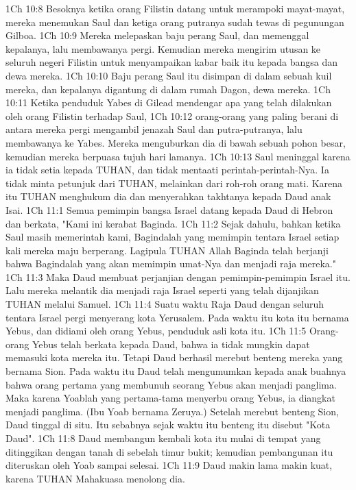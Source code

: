 1Ch 10:8  Besoknya ketika orang Filistin datang untuk merampoki mayat-mayat, mereka menemukan Saul dan ketiga orang putranya sudah tewas di pegunungan Gilboa.
1Ch 10:9  Mereka melepaskan baju perang Saul, dan memenggal kepalanya, lalu membawanya pergi. Kemudian mereka mengirim utusan ke seluruh negeri Filistin untuk menyampaikan kabar baik itu kepada bangsa dan dewa mereka.
1Ch 10:10  Baju perang Saul itu disimpan di dalam sebuah kuil mereka, dan kepalanya digantung di dalam rumah Dagon, dewa mereka.
1Ch 10:11  Ketika penduduk Yabes di Gilead mendengar apa yang telah dilakukan oleh orang Filistin terhadap Saul,
1Ch 10:12  orang-orang yang paling berani di antara mereka pergi mengambil jenazah Saul dan putra-putranya, lalu membawanya ke Yabes. Mereka menguburkan dia di bawah sebuah pohon besar, kemudian mereka berpuasa tujuh hari lamanya.
1Ch 10:13  Saul meninggal karena ia tidak setia kepada TUHAN, dan tidak mentaati perintah-perintah-Nya. Ia tidak minta petunjuk dari TUHAN, melainkan dari roh-roh orang mati. Karena itu TUHAN menghukum dia dan menyerahkan takhtanya kepada Daud anak Isai.
1Ch 11:1  Semua pemimpin bangsa Israel datang kepada Daud di Hebron dan berkata, "Kami ini kerabat Baginda.
1Ch 11:2  Sejak dahulu, bahkan ketika Saul masih memerintah kami, Bagindalah yang memimpin tentara Israel setiap kali mereka maju berperang. Lagipula TUHAN Allah Baginda telah berjanji bahwa Bagindalah yang akan memimpin umat-Nya dan menjadi raja mereka."
1Ch 11:3  Maka Daud membuat perjanjian dengan pemimpin-pemimpin Israel itu. Lalu mereka melantik dia menjadi raja Israel seperti yang telah dijanjikan TUHAN melalui Samuel.
1Ch 11:4  Suatu waktu Raja Daud dengan seluruh tentara Israel pergi menyerang kota Yerusalem. Pada waktu itu kota itu bernama Yebus, dan didiami oleh orang Yebus, penduduk asli kota itu.
1Ch 11:5  Orang-orang Yebus telah berkata kepada Daud, bahwa ia tidak mungkin dapat memasuki kota mereka itu. Tetapi Daud berhasil merebut benteng mereka yang bernama Sion. Pada waktu itu Daud telah mengumumkan kepada anak buahnya bahwa orang pertama yang membunuh seorang Yebus akan menjadi panglima. Maka karena Yoablah yang pertama-tama menyerbu orang Yebus, ia diangkat menjadi panglima. (Ibu Yoab bernama Zeruya.) Setelah merebut benteng Sion, Daud tinggal di situ. Itu sebabnya sejak waktu itu benteng itu disebut "Kota Daud".
1Ch 11:8  Daud membangun kembali kota itu mulai di tempat yang ditinggikan dengan tanah di sebelah timur bukit; kemudian pembangunan itu diteruskan oleh Yoab sampai selesai.
1Ch 11:9  Daud makin lama makin kuat, karena TUHAN Mahakuasa menolong dia.
